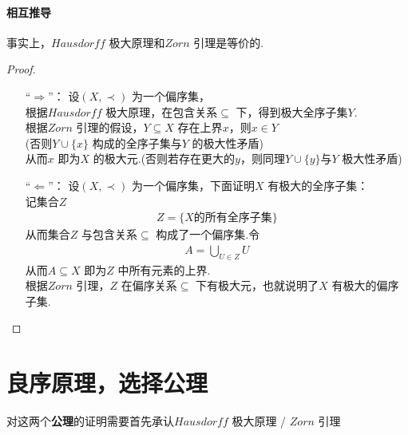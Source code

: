 \paragraph{相互推导}
	事实上，$Hausdorff$ 极大原理和$Zorn$ 引理是等价的.
	\begin{proof}
		\begin{enumerate}
			\item[“$\Rightarrow$”：] 设$(X , \prec)$ 为一个偏序集，\\
			根据$Hausdorff$ 极大原理，在包含关系$\subseteq$ 下，得到极大全序子集$Y$.\\
			根据$Zorn$ 引理的假设，$Y \subseteq X$ 存在上界$x$，则$x \in Y$\\
			(否则$Y \cup \{ x \}$ 构成的全序子集与$Y$ 的极大性矛盾)\\
			从而$x$ 即为$X$ 的极大元.(否则若存在更大的$y$，则同理$Y \cup \{ y \}$与$Y$ 极大性矛盾)
			
			\vspace*{1em}
			
			\item[“$\Leftarrow$”：] 设$(X , \prec)$ 为一个偏序集，下面证明$X$ 有极大的全序子集：\\
			记集合$Z$
			\begin{align}
				Z = \{ X \text{的所有全序子集} \}
			\end{align}
			从而集合$Z$ 与包含关系$\subseteq$ 构成了一个偏序集.令
			\begin{align}
				A = \bigcup_{U \in Z}{U}
			\end{align}
			从而$A \subseteq X$ 即为$Z$ 中所有元素的上界.\\
			根据$Zorn$ 引理，$Z$ 在偏序关系$\subseteq$ 下有极大元，也就说明了$X$ 有极大的偏序子集.
			
		\end{enumerate}
	\end{proof}


\newpage
\section{良序原理，选择公理}
	\begin{center}
		对这两个\textbf{公理}的证明需要首先承认$Hausdorff$ 极大原理 / $Zorn$ 引理
	\end{center}
